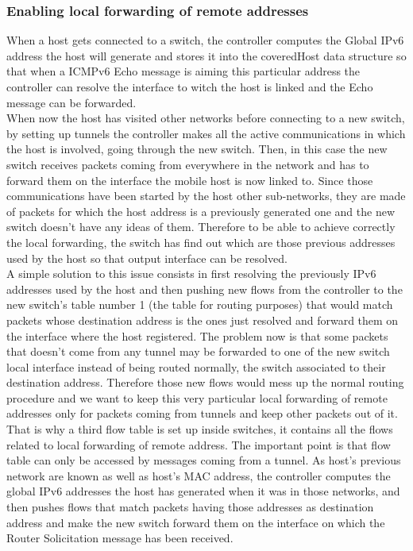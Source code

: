 \documentclass{article}
\begin{document}
\subsubsection{Enabling local forwarding of remote addresses}
When a host gets connected to a switch, the controller computes the
Global IPv6 address the host will generate and stores it into the
coveredHost data structure so that when a ICMPv6 Echo message is
aiming this particular address the controller can resolve the
interface to witch the host is linked and the Echo message can be
forwarded.\\ 
\newline
When now the host has visited other networks before connecting to a
new switch, by setting up tunnels the controller makes all the active
communications in which the host is involved, going through the new
switch. Then, in this case the new switch receives packets coming from
everywhere in the network and has to forward them on the interface the
mobile host is now linked to. Since those communications have been
started by the host other sub-networks, they are made of packets for
which the host address is a previously generated one and the new
switch doesn't have any ideas of them. Therefore to be able to achieve
correctly the local forwarding, the switch has find out which are
those previous addresses used by the host so that output interface can
be resolved.\\
\newline
A simple solution to this issue consists in first resolving the
previously IPv6 addresses used by the host and then pushing new flows
from the controller to the new switch's table number 1 (the table for
routing purposes) that would match packets whose destination address
is the ones just resolved and forward them on the interface where the
host registered. The problem now is that some packets that doesn't
come from any tunnel may be forwarded to one of the new switch local
interface instead of being routed normally, the switch associated to
their destination address. Therefore those new flows would mess up the
normal routing procedure and we want to keep this very particular
local forwarding of remote addresses only for packets coming from
tunnels and keep other packets out of it.\\
\newline
That is why a third flow table is set up inside switches, it contains
all the flows related to local forwarding of remote address. The
important point is that flow table can only be accessed by messages
coming from a tunnel. As host's previous network are known as well as
host's MAC address, the controller computes the global IPv6 addresses
the host has generated when it was in those networks, and then pushes
flows that match packets having those addresses as destination address
and make the new switch forward them on the interface on which the
Router Solicitation message has been received.
\end{document}
